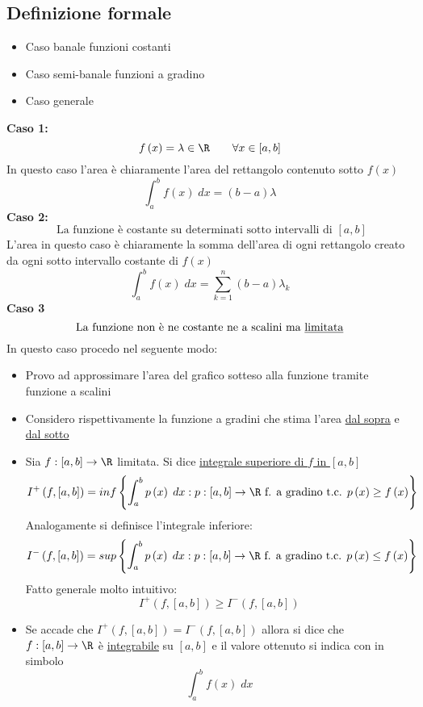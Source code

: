 \subsection{Definizione formale}
\begin{itemize}
	\item Caso banale \rarr funzioni costanti
	\item Caso semi-banale \rarr funzioni a gradino
	\item Caso generale
\end{itemize}
\textbf{Caso 1:}
\[
	f\left( x \right)  = \lambda \in  \R \quad \quad \forall x \in  \left[ a,b \right]
\]
In questo caso l'area è chiaramente l'area del rettangolo contenuto sotto $f\left( x \right) $
\[
	\int_{a}^{b} f\left( x \right)  \; dx = \left( b-a \right) \lambda
\]
\textbf{Caso 2:}
\[
	\text{ La funzione è costante su determinati sotto intervalli di } \left[ a,b \right]
\]
L'area in questo caso è chiaramente la somma dell'area di ogni rettangolo creato da ogni sotto intervallo costante di $ f\left( x \right) $
\[
	\int_{a}^{b} f\left( x \right)  \; dx = \sum_{k=1}^{n} \left( b-a \right) \lambda_k
\]
\textbf{Caso 3}
\[
	\text{ La funzione non è ne costante ne a scalini ma \underline{limitata} }
\]
In questo caso procedo nel seguente modo:
\begin{itemize}
	\item Provo ad approssimare l'area del grafico sotteso alla funzione tramite funzione a scalini
	\item Considero rispettivamente la funzione a gradini che stima l'area \underline{dal sopra} e \underline{dal sotto}
	\item Sia $ f : \left[ a,b \right] \to \R$ limitata. Si dice \underline{integrale superiore di $f$ in $\left[ a,b \right] $}
	      \[
		      I^{+}\left( f, \left[ a,b \right]  \right) = inf \left\{ \int_{a}^{b} p\left( x \right)   \; dx : p:\left[ a,b \right] \to \R \text{ f. a gradino t.c. } p\left( x \right) \ge f\left( x \right)  \right\}
	      \]
	      Analogamente si definisce l'integrale inferiore:
	      \[
		      I^{-}\left( f, \left[ a,b \right]  \right) = sup \left\{ \int_{a}^{b} p\left( x \right)   \; dx : p:\left[ a,b \right] \to \R \text{ f. a gradino t.c. } p\left( x \right) \le f\left( x \right)  \right\}
	      \]
	      Fatto generale molto intuitivo:
	      \[
		      I^{+}\left( f, \left[ a,b \right]  \right) \ge I^{-} \left( f, \left[ a,b \right]  \right)
	      \]
	\item Se accade che $ I^{+}\left( f, \left[ a,b \right]  \right) = I^{-} \left( f, \left[ a,b \right]  \right)  $ allora si dice che $f:  \left[ a,b \right] \to \R$ è \underline{integrabile} su $ \left[ a,b \right] $ e il valore ottenuto si indica con in simbolo
	      \[
		      \int_{a}^{b} f\left( x \right)  \; dx
	      \]
\end{itemize}
